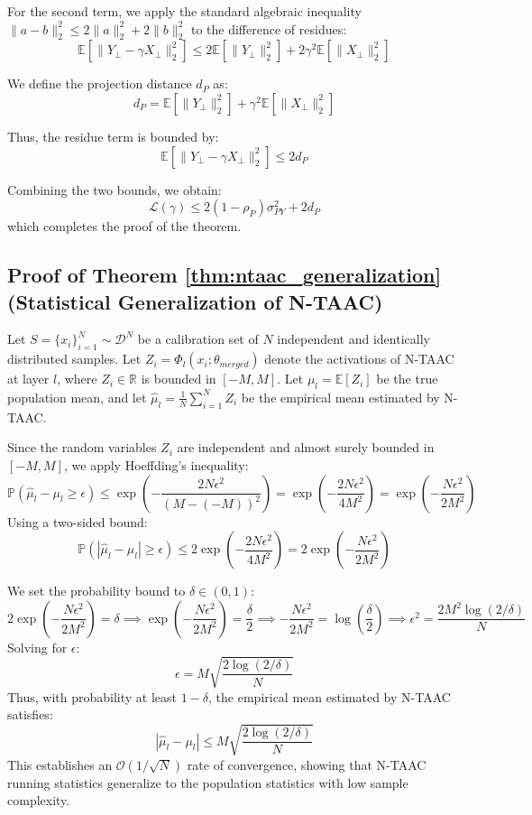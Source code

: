 \documentclass{article}
\theoremstyle{plain}
\theoremstyle{definition}
\theoremstyle{remark}
\begin{document}
For the second term, we apply the standard algebraic inequality $\| a - b \|_2^2 \le 2 \|a\|_2^2 + 2 \|b\|_2^2$ to the difference of residues:
$$\mathbb{E}\left[ \| Y_\perp - \gamma X_\perp \|_2^2 \right] \le 2 \mathbb{E}\left[ \| Y_\perp \|_2^2 \right] + 2 \gamma^2 \mathbb{E}\left[ \| X_\perp \|_2^2 \right]$$

We define the projection distance $d_P$ as:
$$d_P = \mathbb{E}\left[ \|Y_\perp\|_2^2 \right] + \gamma^2 \mathbb{E}\left[ \|X_\perp\|_2^2 \right]$$

Thus, the residue term is bounded by:
$$\mathbb{E}\left[ \| Y_\perp - \gamma X_\perp \|_2^2 \right] \le 2 d_P$$

Combining the two bounds, we obtain:
$$\mathcal{L}(\gamma) \le 2 (1 - \rho_P) \sigma_{PY}^2 + 2 d_P$$
which completes the proof of the theorem.

\subsection{Proof of Theorem \ref{thm:ntaac_generalization} (Statistical Generalization of N-TAAC)}
Let $S = \{x_i\}_{i=1}^N \sim \mathcal{D}^N$ be a calibration set of $N$ independent and identically distributed samples. Let $Z_i = \Phi_l(x_i; \theta_{merged})$ denote the activations of N-TAAC at layer $l$, where $Z_i \in \mathbb{R}$ is bounded in $[-M, M]$. Let $\mu_l = \mathbb{E}[Z_i]$ be the true population mean, and let $\hat{\mu}_l = \frac{1}{N} \sum_{i=1}^N Z_i$ be the empirical mean estimated by N-TAAC.

Since the random variables $Z_i$ are independent and almost surely bounded in $[-M, M]$, we apply Hoeffding's inequality:
$$\mathbb{P}\left( \hat{\mu}_l - \mu_l \ge \epsilon \right) \le \exp\left( - \frac{2 N \epsilon^2}{(M - (-M))^2} \right) = \exp\left( - \frac{2 N \epsilon^2}{4 M^2} \right) = \exp\left( - \frac{N \epsilon^2}{2 M^2} \right)$$
Using a two-sided bound:
$$\mathbb{P}\left( |\hat{\mu}_l - \mu_l| \ge \epsilon \right) \le 2 \exp\left( - \frac{2 N \epsilon^2}{4 M^2} \right) = 2 \exp\left( - \frac{N \epsilon^2}{2 M^2} \right)$$

We set the probability bound to $\delta \in (0, 1)$:
$$2 \exp\left( - \frac{N \epsilon^2}{2 M^2} \right) = \delta \implies \exp\left( - \frac{N \epsilon^2}{2 M^2} \right) = \frac{\delta}{2} \implies - \frac{N \epsilon^2}{2 M^2} = \log\left(\frac{\delta}{2}\right) \implies \epsilon^2 = \frac{2 M^2 \log(2/\delta)}{N}$$
Solving for $\epsilon$:
$$\epsilon = M \sqrt{\frac{2 \log(2/\delta)}{N}}$$
Thus, with probability at least $1 - \delta$, the empirical mean estimated by N-TAAC satisfies:
$$|\hat{\mu}_l - \mu_l| \le M \sqrt{\frac{2 \log(2/\delta)}{N}}$$
This establishes an $\mathcal{O}(1/\sqrt{N})$ rate of convergence, showing that N-TAAC running statistics generalize to the population statistics with low sample complexity.
\end{document}
